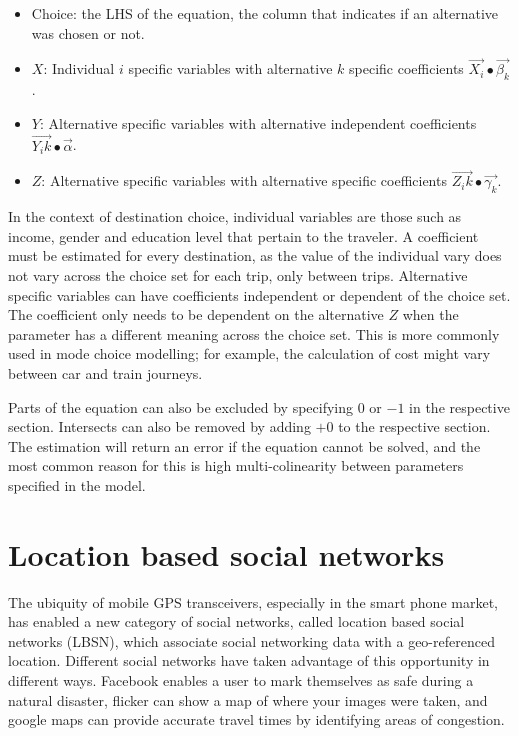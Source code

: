 \begin{itemize}
	\item Choice: the LHS of the equation, the column that indicates if an alternative was chosen or not.
	\item $X$: Individual $i$ specific variables with alternative $k$ specific coefficients $\vec{X_i} ∙\vec{\beta_k}$.

	\item $Y$: Alternative specific variables with alternative independent coefficients $\vec{Y_ik} ∙\vec{\alpha}$. 
	\item $Z$: Alternative specific variables with alternative specific coefficients
$\vec{Z_ik} ∙\vec{\gamma_k}$.
\end{itemize}

In the context of destination choice, individual variables are those such as income, gender and education level that pertain to the traveler. A coefficient must be estimated for every destination, as the value of the individual vary does not vary across the choice set for each trip, only between trips. Alternative specific variables can have coefficients independent or dependent of the choice set. The coefficient only needs to be dependent on the alternative $Z$ when the parameter has a different meaning across the choice set. This is more commonly used in mode choice modelling; for example, the calculation of cost might vary between car and train journeys.

Parts of the equation can also be excluded by specifying $0$ or $-1$ in the respective section. Intersects can also be removed by adding $+ 0$ to the respective section. The estimation will return an error if the equation cannot be solved, and the most common reason for this is high multi-colinearity between parameters specified in the model.

\section{Location based social networks}
The ubiquity of mobile GPS transceivers, especially in the smart phone market, has enabled a new category of social networks, called location based social networks (LBSN), which associate social networking data with a geo-referenced location. Different social networks have taken advantage of this opportunity in different ways. Facebook enables a user to mark themselves as safe during a natural disaster, flicker can show a map of where your images were taken, and google maps can provide accurate travel times by identifying areas of congestion. 

